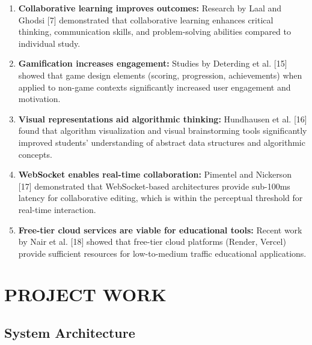 \documentclass[12pt,a4paper,oneside]{report}
\begin{document}
\begin{enumerate}[label=\arabic*.]
    \item \textbf{Collaborative learning improves outcomes:} Research by Laal and Ghodsi [7] demonstrated that collaborative learning enhances critical thinking, communication skills, and problem-solving abilities compared to individual study.
    \item \textbf{Gamification increases engagement:} Studies by Deterding et al. [15] showed that game design elements (scoring, progression, achievements) when applied to non-game contexts significantly increased user engagement and motivation.
    \item \textbf{Visual representations aid algorithmic thinking:} Hundhausen et al. [16] found that algorithm visualization and visual brainstorming tools significantly improved students' understanding of abstract data structures and algorithmic concepts.
    \item \textbf{WebSocket enables real-time collaboration:} Pimentel and Nickerson [17] demonstrated that WebSocket-based architectures provide sub-100ms latency for collaborative editing, which is within the perceptual threshold for real-time interaction.
    \item \textbf{Free-tier cloud services are viable for educational tools:} Recent work by Nair et al. [18] showed that free-tier cloud platforms (Render, Vercel) provide sufficient resources for low-to-medium traffic educational applications.
\end{enumerate}




\chapter{PROJECT WORK}

\section{System Architecture}
\end{document}

